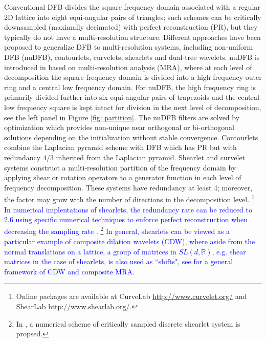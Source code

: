 Conventional DFB \cite{DFB92} divides the square frequency domain associated with a regular 2D lattice into eight equi-angular pairs of triangles; such schemes can be critically downsampled (maximally decimated) with perfect reconstruction (PR), but they typically do not have a multi-resolution structure. 
Different approaches have been proposed to generalize DFB to multi-resolution systems, including non-uniform DFB (nuDFB), contourlets, curvelets, shearlets and dual-tree wavelets.
nuDFB is introduced in \cite{nuDFB05} based on multi-resolution analysis (MRA), where at each level of decomposition the square frequency domain is divided into a high frequency outer ring and a central low frequency domain. For nuDFB, the high frequency ring is primarily divided further into six equi-angular pairs of trapezoids and the central low frequency square is kept intact for division in the next level of decomposition, see the left panel in Figure \ref{fig: partition}. The nuDFB filters are solved by optimization which provides non-unique near orthogonal or bi-orthogonal solutions depending on the initialization without stable convergence.
Contourlets \cite{do2005contourlet} combine the Laplacian pyramid scheme with DFB which has PR but with redundancy $4/3$ inherited from the Laplacian pyramid.
Shearlet \cite{shearlet12book,easley2008sparse} and curvelet \cite{candes2006fast} systems construct a multi-resolution partition of the frequency domain by applying shear or rotation operators to a generator function in each level of frequency decomposition. 
These systems have redundancy at least 4; moreover, the factor may grow with the number of directions in the decomposition level. \footnote{Online packages are available at CurveLab \url{http://www.curvelet.org/} and ShearLab \url{http://www.shearlab.org/}.}
\textcolor{blue}{In numerical implentations of shearlets, the redundancy rate can be reduced to 2.6 using specific numerical techniques to enforce perfect reconstruction when decreasing the sampling rate \cite{goossens2011design}. \footnote{In \cite{easley2009critically}, a numerical scheme of critically sampled discrete shearlet system is propsed.}
In general, shearlets can be viewed as a particular example of composite dilation wavelets (CDW), where aside from the normal translations on a lattice, a group of matrices in $SL(d, \mathbb{R})$, e.g. shear matrices in the case of shearlets, is also used as ``shifts", see \cite{blanchard2012matricial} for a general framework of CDW and composite MRA.}
